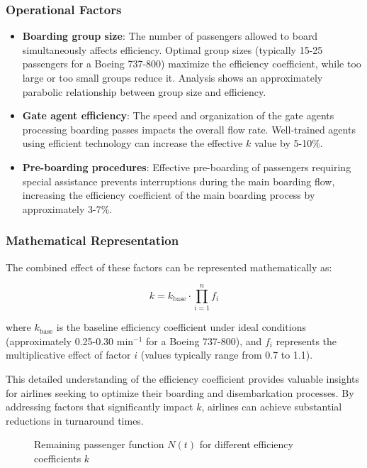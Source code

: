\documentclass[12pt,a4paper]{article}
\begin{document}
\subsubsection{Operational Factors}
\begin{itemize}
    \item \textbf{Boarding group size}: The number of passengers allowed to board simultaneously affects efficiency. Optimal group sizes (typically 15-25 passengers for a Boeing 737-800) maximize the efficiency coefficient, while too large or too small groups reduce it. Analysis shows an approximately parabolic relationship between group size and efficiency.
    
    \item \textbf{Gate agent efficiency}: The speed and organization of the gate agents processing boarding passes impacts the overall flow rate. Well-trained agents using efficient technology can increase the effective $k$ value by 5-10\%.
    
    \item \textbf{Pre-boarding procedures}: Effective pre-boarding of passengers requiring special assistance prevents interruptions during the main boarding flow, increasing the efficiency coefficient of the main boarding process by approximately 3-7\%.
\end{itemize}

\subsubsection{Mathematical Representation}
The combined effect of these factors can be represented mathematically as:

\begin{equation}
k = k_{\text{base}} \cdot \prod_{i=1}^{n} f_i
\end{equation}

where $k_{\text{base}}$ is the baseline efficiency coefficient under ideal conditions (approximately 0.25-0.30 min$^{-1}$ for a Boeing 737-800), and $f_i$ represents the multiplicative effect of factor $i$ (values typically range from 0.7 to 1.1).

This detailed understanding of the efficiency coefficient provides valuable insights for airlines seeking to optimize their boarding and disembarkation processes. By addressing factors that significantly impact $k$, airlines can achieve substantial reductions in turnaround times.

\begin{figure}[H]
\centering
{}
\caption{Remaining passenger function $N(t)$ for different efficiency coefficients $k$}
\label{fig:remaining_passengers}
\end{figure}
\end{document}
